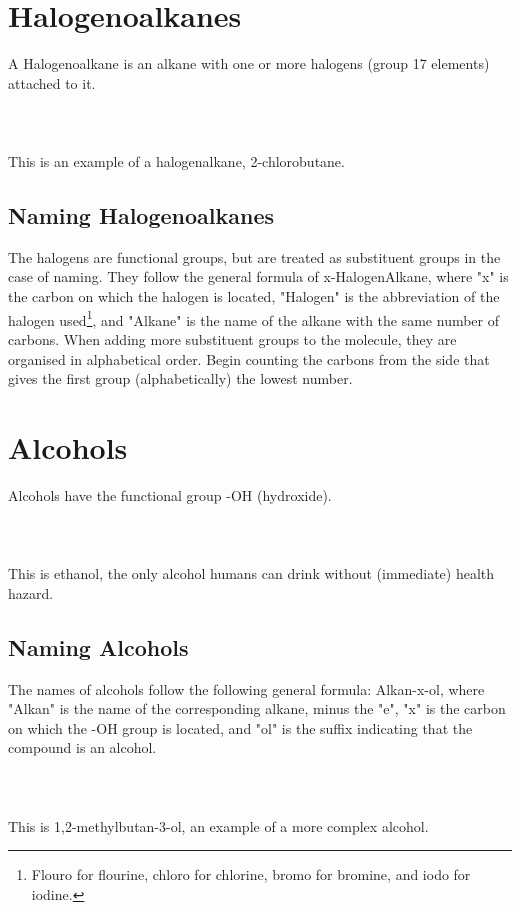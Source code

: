 \documentclass[11pt,twoside]{article}
\begin{document}
	\tableofcontents
	
	\section{Halogenoalkanes}
		A Halogenoalkane is an alkane with one or more halogens (group 17 elements) attached to it.
		\\ \\
		\\ \\
		This is an example of a halogenalkane, 2-chlorobutane.
		
		\subsection{Naming Halogenoalkanes}
			The halogens are functional groups, but are treated as substituent groups in the case of naming. They follow the general formula of x-HalogenAlkane, where "x" is the carbon on which the halogen is located, "Halogen" is the abbreviation of the halogen used\footnote{Flouro for flourine, chloro for chlorine, bromo for bromine, and iodo for iodine.}, and "Alkane" is the name of the alkane with the same number of carbons. When adding more substituent groups to the molecule, they are organised in alphabetical order. Begin counting the carbons from the side that gives the first group (alphabetically) the lowest number.
			
	\section{Alcohols}
		Alcohols have the functional group -OH (hydroxide).
		\\ \\
		\\ \\
		This is ethanol, the only alcohol humans can drink without (immediate) health hazard.
		\subsection{Naming Alcohols}
			The names of alcohols follow the following general formula: Alkan-x-ol, where "Alkan" is the name of the corresponding alkane, minus the "e", "x" is the carbon on which the -OH group is located, and "ol" is the suffix indicating that the compound is an alcohol.
			\\ \\
			\\ \\
			This is 1,2-methylbutan-3-ol, an example of a more complex alcohol.
\end{document}
